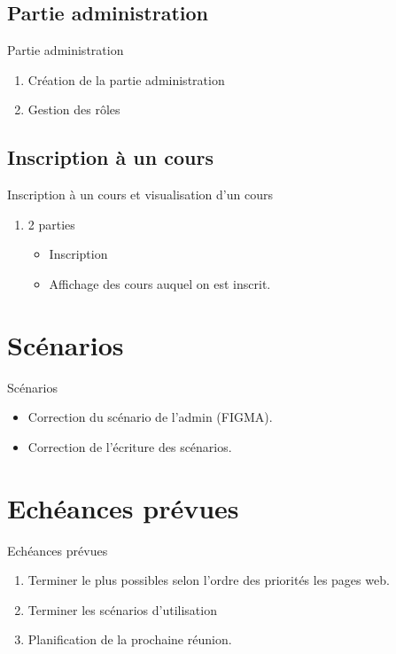 \documentclass[numbering=fraction]{beamer}
\begin{document}
\subsection{Partie administration}
\begin{frame}{Partie administration}
    \begin{enumerate}
        \item Création de la partie administration
        \item Gestion des rôles
    \end{enumerate}
\end{frame}
\subsection{Inscription à un cours}
\begin{frame}{Inscription à un cours et visualisation d'un cours}
    \begin{enumerate}
        \item 2 parties
        \begin{itemize}
            \item Inscription
            \item Affichage des cours auquel on est inscrit.
        \end{itemize}
    \end{enumerate}
\end{frame}
\section{Scénarios}
\begin{frame}{Scénarios}
    \begin{itemize}
        \item Correction du scénario de l'admin (FIGMA).
        \item Correction de l'écriture des scénarios.
    \end{itemize}
\end{frame}
\section{Echéances prévues}
\begin{frame}{Echéances prévues}
    \begin{enumerate}
        \item Terminer le plus possibles selon l'ordre des priorités les pages web.
        \item Terminer les scénarios d'utilisation
        \item Planification de la prochaine réunion.
    \end{enumerate}
\end{frame}
\end{document}
